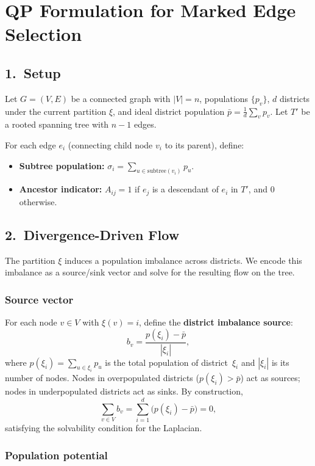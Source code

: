 \documentclass[11pt]{article}
\newcommand{\pbar}{\bar{p}}
\begin{document}
\section*{QP Formulation for Marked Edge Selection}

\subsection*{1.\ Setup}

Let $G = (V, E)$ be a connected graph with $|V| = n$, populations $\{p_v\}$,
$d$ districts under the current partition $\xi$, and ideal district population
$\pbar = \frac{1}{d}\sum_v p_v$. Let $T'$ be a rooted spanning tree with
$n - 1$ edges.

For each edge $e_i$ (connecting child node $v_i$ to its parent), define:
\begin{itemize}
  \item \textbf{Subtree population:}
    $\displaystyle \sigma_i = \sum_{u \in \mathrm{subtree}(v_i)} p_u$.
  \item \textbf{Ancestor indicator:}
    $A_{ij} = 1$ if $e_j$ is a descendant of $e_i$ in $T'$, and $0$ otherwise.
\end{itemize}

\subsection*{2.\ Divergence-Driven Flow}

The partition $\xi$ induces a population imbalance across districts. We encode
this imbalance as a source/sink vector and solve for the resulting flow on the
tree.

\subsubsection*{Source vector}

For each node $v \in V$ with $\xi(v) = i$, define the \textbf{district
imbalance source}:
\[
  b_v = \frac{p(\xi_i) - \pbar}{|\xi_i|},
\]
where $p(\xi_i) = \sum_{u \in \xi_i} p_u$ is the total population of
district~$\xi_i$ and $|\xi_i|$ is its number of nodes. Nodes in overpopulated
districts ($p(\xi_i) > \pbar$) act as sources; nodes in underpopulated
districts act as sinks. By construction,
\[
  \sum_{v \in V} b_v = \sum_{i=1}^d \bigl(p(\xi_i) - \pbar\bigr) = 0,
\]
satisfying the solvability condition for the Laplacian.

\subsubsection*{Population potential}
\end{document}
